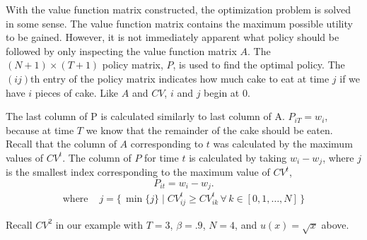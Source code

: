 With the value function matrix constructed, the optimization problem is solved in some sense.
The value function matrix contains the maximum possible utility to be gained.
However, it is not immediately apparent what policy should be followed by only inspecting the value function matrix $A$.
The $(N+1) \times (T+1)$ policy matrix, $P$, is used to find the optimal policy.
The $(ij)$th entry of the policy matrix indicates how much cake to eat at time $j$ if we have $i$ pieces of cake.
Like $A$ and $CV$, $i$ and $j$ begin at $0$.

The last column of P is calculated similarly to last column of A.
$P_{iT} = w_i$, because at time $T$ we know that the remainder of the cake should be eaten.
Recall that the column of $A$ corresponding to $t$ was calculated by the maximum values of $CV^{t}$.
The column of $P$ for time $t$ is calculated by taking $w_i - w_j$, where $j$ is the smallest index corresponding to the maximum value of $CV^{t}$,
\[
P_{it} = w_i - w_j.
\]
\begin{align*}
\mbox{where} \, \, & j = \{\, \min\{j\} \mid CV_{ij}^t \geq CV_{ik}^t \, \forall \, k \in \left[0,1, \ldots , N \right] \,\}
\end{align*}

Recall $CV^2$ in our example with $T=3$, $\beta=.9$, $N=4$, and $u(x) = \sqrt{x}$ above.

\begin{center}
\end{center}

